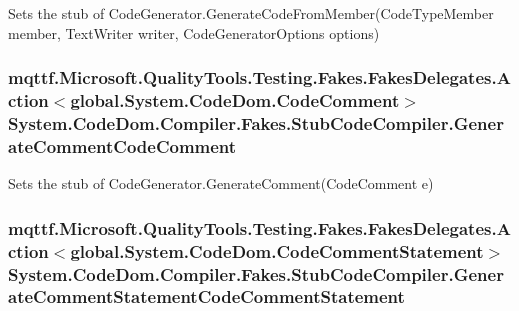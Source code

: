 Sets the stub of Code\-Generator.\-Generate\-Code\-From\-Member(\-Code\-Type\-Member member, Text\-Writer writer, Code\-Generator\-Options options)

\hypertarget{class_system_1_1_code_dom_1_1_compiler_1_1_fakes_1_1_stub_code_compiler_a6d5a154c6b271bd345946f17b196b47d}{
\subsubsection[{Generate\-Comment\-Code\-Comment}]{\setlength{\rightskip}{0pt plus 5cm}mqttf.\-Microsoft.\-Quality\-Tools.\-Testing.\-Fakes.\-Fakes\-Delegates.\-Action$<$global.\-System.\-Code\-Dom.\-Code\-Comment$>$ System.\-Code\-Dom.\-Compiler.\-Fakes.\-Stub\-Code\-Compiler.\-Generate\-Comment\-Code\-Comment}}\label{class_system_1_1_code_dom_1_1_compiler_1_1_fakes_1_1_stub_code_compiler_a6d5a154c6b271bd345946f17b196b47d}


Sets the stub of Code\-Generator.\-Generate\-Comment(\-Code\-Comment e)

\hypertarget{class_system_1_1_code_dom_1_1_compiler_1_1_fakes_1_1_stub_code_compiler_aa355652e06ea4d89d7c02bc4ab443ddb}{
\subsubsection[{Generate\-Comment\-Statement\-Code\-Comment\-Statement}]{\setlength{\rightskip}{0pt plus 5cm}mqttf.\-Microsoft.\-Quality\-Tools.\-Testing.\-Fakes.\-Fakes\-Delegates.\-Action$<$global.\-System.\-Code\-Dom.\-Code\-Comment\-Statement$>$ System.\-Code\-Dom.\-Compiler.\-Fakes.\-Stub\-Code\-Compiler.\-Generate\-Comment\-Statement\-Code\-Comment\-Statement}}\label{class_system_1_1_code_dom_1_1_compiler_1_1_fakes_1_1_stub_code_compiler_aa355652e06ea4d89d7c02bc4ab443ddb}


